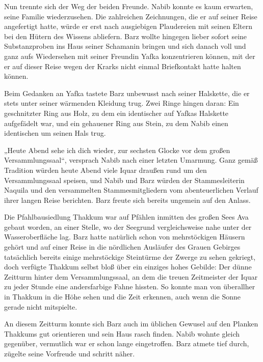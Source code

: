 Nun trennte sich der Weg der beiden Freunde. Nabib konnte es kaum erwarten, seine Familie wiederzusehen. Die zahlreichen Zeichnungen, die er auf seiner Reise angefertigt hatte, würde er erst nach ausgiebigen Plaudereien mit seinen Eltern bei den Hütern des Wissens abliefern. Barz wollte hingegen lieber sofort seine Substanzproben ins Haus seiner Schamanin bringen und sich danach voll und ganz aufs Wiedersehen mit seiner Freundin Yafka konzentrieren können, mit der er auf dieser Reise wegen der Krarks nicht einmal Briefkontakt hatte halten können.

Beim Gedanken an Yafka tastete Barz unbewusst nach seiner Halskette, die er stets unter seiner wärmenden Kleidung trug. Zwei Ringe hingen daran: Ein geschnitzter Ring aus Holz, zu dem ein identischer auf Yafkas Halskette aufgefädelt war, und ein gehauener Ring aus Stein, zu dem Nabib einen identischen um seinen Hals trug.

„Heute Abend sehe ich dich wieder, zur sechsten Glocke vor dem großen Versammlungssaal“, versprach Nabib nach einer letzten Umarmung. Ganz gemäß Tradition würden heute Abend viele Iquar draußen rund um den Versammlungssaal speisen, und Nabib und Barz würden der Stammesleiterin Naquila und den versammelten Stammesmitgliedern vom abenteuerlichen Verlauf ihrer langen Reise berichten. Barz freute sich bereits ungemein auf den Anlass.\bigskip







Die Pfahlbausiedlung Thakkum war auf Pfählen inmitten des großen Sees Ava gebaut worden, an einer Stelle, wo der Seegrund vergleichsweise nahe unter der Wasseroberfläche lag. Barz hatte natürlich schon von mehrstöckigen Häusern gehört und auf einer Reise in die nördlichen Ausläufer des Grauen Gebirges tatsächlich bereits einige mehrstöckige Steintürme der Zwerge zu sehen gekriegt, doch verfügte Thakkum selbst bloß über ein einziges hohes Gebilde: Der dünne Zeitturm hinter dem Versammlungssaal, an dem die treuen Zeitmeister der Iquar zu jeder Stunde eine andersfarbige Fahne hissten. So konnte man von überallher in Thakkum in die Höhe sehen und die Zeit erkennen, auch wenn die Sonne gerade nicht mitspielte.

An diesem Zeitturm konnte sich Barz auch im üblichen Gewusel auf den Planken Thakkums gut orientieren und sein Haus rasch finden. Nabib wohnte gleich gegenüber, vermutlich war er schon lange eingetroffen. Barz atmete tief durch, zügelte seine Vorfreude und schritt näher.

